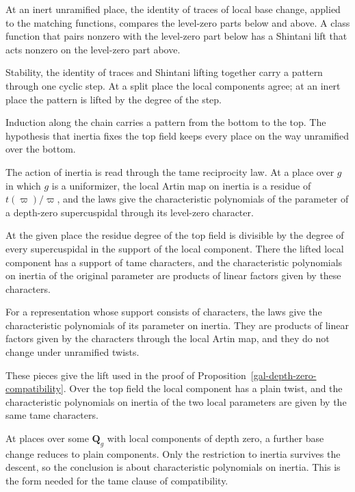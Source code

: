 At an inert unramified place, the identity of traces of local base change, applied to the matching
functions, compares the level-zero parts below and above. A class function that pairs nonzero with the
level-zero part below has a Shintani lift that acts nonzero on the level-zero part above.

Stability, the identity of traces and Shintani lifting together carry a pattern through one cyclic
step. At a split place the local components agree; at an inert place the pattern is lifted by the
degree of the step.

Induction along the chain carries a pattern from the bottom to the top. The hypothesis that inertia
fixes the top field keeps every place on the way unramified over the bottom.

The action of inertia is read through the tame reciprocity law. At a place over $g$ in which $g$ is a
uniformizer, the local Artin map on inertia is a residue of $t(\varpi)/\varpi$, and the laws give the
characteristic polynomials of the parameter of a depth-zero supercuspidal through its level-zero
character.

At the given place the residue degree of the top field is divisible by the degree of every
supercuspidal in the support of the local component. There the lifted local component has a support of
tame characters, and the characteristic polynomials on inertia of the original parameter are products
of linear factors given by these characters.

For a representation whose support consists of characters, the laws give the characteristic
polynomials of its parameter on inertia. They are products of linear factors given by the characters
through the local Artin map, and they do not change under unramified twists.

These pieces give the lift used in the proof of Proposition~\ref{gal-depth-zero-compatibility}. Over
the top field the local component has a plain twist, and the characteristic polynomials on inertia of
the two local parameters are given by the same tame characters.

At places over some $\mathbf Q_g$ with local components of depth zero, a further base change reduces
to plain components. Only the restriction to inertia survives the descent, so the conclusion is about
characteristic polynomials on inertia. This is the form needed for the tame clause of compatibility.

